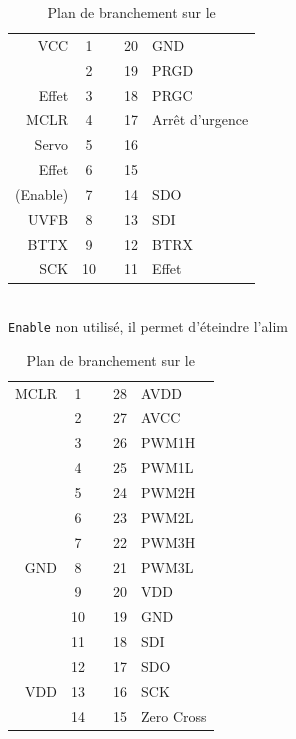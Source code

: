 		\begin{table}[hb]
			\begin{multicols}{2}
			\begin{center}
			
			
			\begin{footnotesize}
			\begin{tabular}{r|ccc|l}
				VCC		& 1 &   & 20 & GND \\ 
				  		& 2 &   & 19 & PRGD \\ 
				Effet	& 3 &   & 18 & PRGC \\ 
				MCLR 	& 4 &   & 17 & Arrêt d'urgence \\ 
				Servo 	& 5 &   & 16 &   \\
				 Effet	& 6 &   & 15 &   \\ 
				(Enable)	& 7 &   & 14 & SDO \\ 
				UVFB 	& 8 &   & 13 & SDI \\ 
				BTTX 	& 9 &   & 12 & BTRX \\ 
				SCK 	& 10&   & 11 & Effet   \\ 
				\end{tabular} 
				\\ \texttt{Enable} non utilisé, il permet d'éteindre l'alim
			\end{footnotesize}
				
			
			\caption{Plan de branchement sur le \pic}
			\label{pinoutpic}
		
			
			\begin{footnotesize}
				\begin{tabular}{r|ccc|l}
				MCLR 	& 1 &    & 28 & AVDD 	\\ 
				  		& 2 &    & 27 & AVCC 	\\ 
				  		& 3 &    & 26 & PWM1H	\\
				  		& 4 &    & 25 & PWM1L	\\ 
				  		& 5 &    & 24 & PWM2H	\\ 
				  		& 6 &    & 23 & PWM2L  	\\ 
				 		& 7 &    & 22 & PWM3H  	\\ 
				GND 	& 8 &    & 21 & PWM3L  	\\ 
				  		& 9 &    & 20 & VDD 	\\ 
				  		& 10 &   & 19 & GND 	\\ 
				  		& 11 &   & 18 & SDI 	\\ 
				  		& 12 &   & 17 & SDO 	\\ 
				VDD 	& 13 &   & 16 & SCK 	\\ 
				  		& 14 &   & 15 & Zero Cross\\ 
				\end{tabular} 
			\end{footnotesize}
			\caption{Plan de branchement sur le \dspic}
			\label{pinoutdspic}
			\end{center}
			\end{multicols}
		\end{table}

